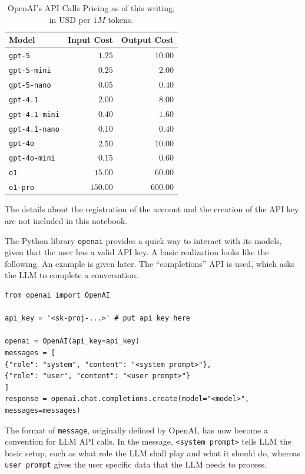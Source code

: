 \begin{table}
	\centering \caption{OpenAI's API Calls Pricing as of this writing, in USD per $1M$ tokens.}\label{tab:openai_api_price}
	\begin{tabular}{lrr}
		\hline
		Model & Input Cost & Output Cost \\ \hline
        \texttt{gpt-5} & $1.25$ & $10.00$ \\
        \texttt{gpt-5-mini} & $0.25$ & $2.00$ \\
        \texttt{gpt-5-nano} & $0.05$ & $0.40$ \\
        \texttt{gpt-4.1} & $2.00$ & $8.00$ \\
        \texttt{gpt-4.1-mini} & $0.40$ & $1.60$ \\
        \texttt{gpt-4.1-nano} & $0.10$ & $0.40$ \\
        \texttt{gpt-4o} & $2.50$ & $10.00$ \\
        \texttt{gpt-4o-mini} & $0.15$ & $0.60$ \\
        \texttt{o1} & $15.00$ & $60.00$ \\
        \texttt{o1-pro} & $150.00$ & $600.00$ \\
		\hline
	\end{tabular}
\end{table}

The details about the registration of the account and the creation of the API key are not included in this notebook.

The Python library \verb|openai| provides a quick way to interact with its models, given that the user has a valid API key. A basic realization looks like the following. An example is given later. The ``completions'' API is used, which asks the LLM to complete a conversation.
\begin{lstlisting}
from openai import OpenAI

api_key = '<sk-proj-...>' # put api key here

openai = OpenAI(api_key=api_key)
messages = [
{"role": "system", "content": "<system prompt>"},
{"role": "user", "content": "<user prompt>"}
]
response = openai.chat.completions.create(model="<model>", messages=messages)
\end{lstlisting}

The format of \verb|message|, originally defined by OpenAI, has now become a convention for LLM API calls. In the message, \verb|<system prompt>| tells LLM the basic setup, such as what role the LLM shall play and what it should do, whereas \verb|user prompt| gives the user specific data that the LLM needs to process.

